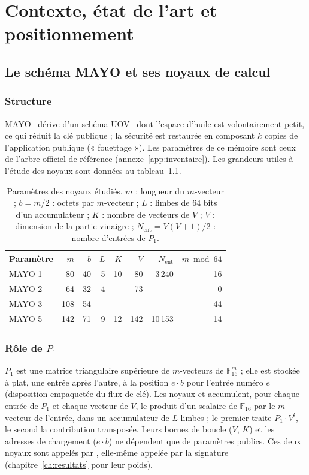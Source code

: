 \chapter{Contexte, état de l'art et positionnement}
\label{ch:etat}

\section{Le schéma MAYO et ses noyaux de calcul}
\subsection{Structure}
MAYO~\cite{mayo} dérive d'un schéma UOV~\cite{uov} dont l'espace d'huile est volontairement petit, ce qui réduit la clé publique ; la sécurité est restaurée en composant $k$ copies de l'application publique (« fouettage »). Les paramètres de ce mémoire sont ceux de l'arbre officiel de référence (annexe~\ref{app:inventaire}). Les grandeurs utiles à l'étude des noyaux sont données au tableau~\ref{tab:params}.

\begin{table}[ht]\centering\small
\caption{Paramètres des noyaux étudiés. $m$ : longueur du $m$-vecteur ; $b=m/2$ : octets par $m$-vecteur ; $L$ : limbes de 64 bits d'un accumulateur ; $K$ : nombre de vecteurs de $V$ ; $V$ : dimension de la partie vinaigre ; $N_{\mathrm{ent}}=V(V+1)/2$ : nombre d'entrées de $P_1$.}\label{tab:params}
\begin{tabular}{@{}lrrrrrrr@{}}\toprule
Paramètre & $m$ & $b$ & $L$ & $K$ & $V$ & $N_{\mathrm{ent}}$ & $m \bmod 64$\\\midrule
MAYO-1 & 80 & 40 & 5 & 10 & 80 & 3\,240 & 16\\
MAYO-2 & 64 & 32 & 4 & -- & 73 & -- & 0\\
MAYO-3 & 108 & 54 & -- & -- & -- & -- & 44\\
MAYO-5 & 142 & 71 & 9 & 12 & 142 & 10\,153 & 14\\\bottomrule
\end{tabular}
\end{table}

\subsection{Rôle de $P_1$}
$P_1$ est une matrice triangulaire supérieure de $m$-vecteurs de $\mathbb{F}_{16}^m$ ; elle est stockée à plat, une entrée après l'autre, à la position $e\cdot b$ pour l'entrée numéro $e$ (disposition empaquetée du flux de clé). Les noyaux  et  accumulent, pour chaque entrée de $P_1$ et chaque vecteur de $V$, le produit d'un scalaire de $\mathbb{F}_{16}$ par le $m$-vecteur de l'entrée, dans un accumulateur de $L$ limbes ; le premier traite $P_1\cdot V^{t}$, le second la contribution transposée. Leurs bornes de boucle ($V$, $K$) et les adresses de chargement ($e\cdot b$) ne dépendent que de paramètres publics. Ces deux noyaux sont appelés par , elle-même appelée par la signature (chapitre~\ref{ch:resultats} pour leur poids).

